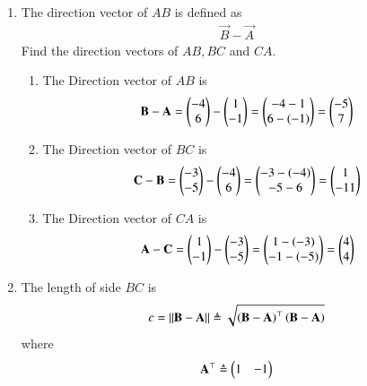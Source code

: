 \begin{enumerate}[label=\thesubsection.\arabic*.,ref=\thesubsection.\theenumi]
\item The direction vector of $AB$ is defined as
		\begin{align}
			\vec{B}-
			\vec{A}
		\end{align}
Find the direction vectors of $AB, BC$ and $CA$.
\\
\solution 
\begin{enumerate} 
\item  The Direction vector of $AB$ is 
	\begin{align}  \mathbf{B} - \mathbf{A} 
		=\begin{pmatrix} -4\\ 6 \end{pmatrix} - \begin{pmatrix} 1\\ -1 \end{pmatrix}
 = \begin{pmatrix} -4 - 1\\ 6 - (-1) \end{pmatrix} = \begin{pmatrix} -5\\ 7 \end{pmatrix}
		\label{eq:app-geo-dir-vec-ab}
 \end{align}
\item The Direction vector of $BC$ is
	\begin{align} \mathbf{C} - \mathbf{B}=\begin{pmatrix} -3\\ -5\end{pmatrix} - \begin{pmatrix} -4\\ 6 \end{pmatrix}
 = \begin{pmatrix} -3 - (-4)\\ -5 - 6 \end{pmatrix} = \begin{pmatrix}1\\ -11 \end{pmatrix}
		\label{eq:app-geo-dir-vec-bc}
  \end{align}
  \item  The Direction vector of $CA$  is
	  \begin{align}  \mathbf{A} - \mathbf{C} =\begin{pmatrix} 1\\ -1 \end{pmatrix}-\begin{pmatrix} -3\\ -5\end{pmatrix}
 = \begin{pmatrix} 1 - (-3)\\ -1 - (-5) \end{pmatrix} = \begin{pmatrix} 4\\ 4 \end{pmatrix}
		\label{eq:app-geo-dir-vec-ca}
  \end{align}
 \end{enumerate}
%	
	\item The length of side $BC$ is 
		\label{prob:side-length}
		\begin{align}
			c = \left\lVert\mathbf{B}-\mathbf{A}\right\rVert \triangleq \sqrt{\left(\mathbf{B}-\mathbf{A}\right)^{\top}\left(\mathbf{B}-\mathbf{A}\right)}
		\end{align}
		where
		\begin{align}
			\mathbf{A}^{\top}\triangleq\begin{pmatrix}1 & -1\end{pmatrix}
		\end{align}

\end{enumerate}
